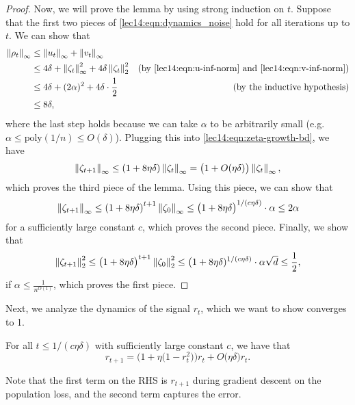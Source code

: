 \begin{proof}
Now, we will prove the lemma by using strong induction on $t$. Suppose that the first two pieces of \eqref{lec14:eqn:dynamics_noise} hold for all iterations up to $t$. We can show that
\begin{align}
\left\|\rho_{t}\right\|_{\infty} &\leq \left\|u_{t}\right\|_{\infty} + \left\|v_{t}\right\|_{\infty}  \\
&\leq 4\delta + \left\|\zeta_t\right\|_{\infty}^{2} + 4\delta \left\|\zeta_t\right\|_{2}^{2} &(\text{by \eqref{lec14:eqn:u-inf-norm} and \eqref{lec14:eqn:v-inf-norm}}) \\
&\leq  4\delta + (2\alpha)^2 + 4\delta \cdot \frac{1}{2} &(\text{by the inductive hypothesis})\\
\label{lec14:eqn:diff-inf-norm}
&\leq 8\delta,
\end{align}
where the last step holds because we can take $\alpha$ to be arbitrarily small (e.g. $\alpha \leq \text{poly}(1/n) \leq O(\delta)$). Plugging this into \eqref{lec14:eqn:zeta-growth-bd}, we have
\begin{equation}
\left\|\zeta_{t+1}\right\|_\infty \leq (1 + 8\eta \delta) \left\|\zeta_t\right\|_{\infty} = \big(1 + O(\eta\delta)\big) \left\|\zeta_t\right\|_\infty,
\end{equation}
which proves the third piece of the lemma. Using this piece, we can show that
\begin{equation}
\left\|\zeta_{t+1}\right\|_{\infty} \leq \left(1 + 8 \eta \delta\right)^{t+1} \left\|\zeta_{0}\right\|_{\infty} \leq \big(1 + 8\eta \delta\big) ^{1/(c\eta \delta)} \cdot \alpha  \leq 2\alpha
\end{equation}
for a sufficiently large constant $c$, which proves the second piece. Finally, we show that
\begin{equation}
\left\|\zeta_{t+1}\right\|_{2}^2 \leq \big(1 + 8\eta \delta\big)^{t+1}\left\|\zeta_{0}\right\|_{2}^2 \leq \big(1 + 8\eta \delta)^{1/(c\eta \delta)} \cdot \alpha \sqrt{d} \leq \frac{1}{2},
\end{equation}
if $\alpha \leq \frac{1}{n^{O(1)}}$, which proves the first piece.

\end{proof}


Next, we analyze the dynamics of the signal $r_t$, which we want to show converges to 1.

\begin{lemma} \label{lec14:lem:dynamics_signal}
    For all $t\leq 1 / (c\eta\delta)$ with sufficiently large constant $c$, we have that
    \[ r_{t+1} = \big(1 + \eta\big( 1 - r_t^2 \big) \big) r_t + O\big(\eta\delta\big) r_t. \]
\end{lemma}
Note that the first term on the RHS is $r_{t+1}$ during gradient descent on the population loss, and the second term captures the error.


